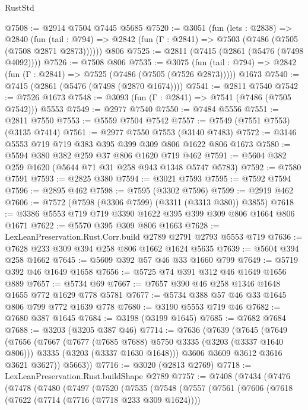 \begin{lexlean}{RustStd}
\begin{coremodule}
@7508 := @2914 @7504 @7445 @5685
@7520 := @3051
    (fun (lets : @2838) =>
    @2840
      (fun (tail : @794) => @2842 (fun (Γ : @2841) => @7503 (@7486 (@7505 (@7508 @2871 @2873))))))
    @806
@7525 := @2811 (@7415 (@2861 (@5476 (@7498 @4092))))
@7526 := @7508 @806
@7535 := @3075
    (fun (tail : @794) => @2842 (fun (Γ : @2841) => @7525 (@7486 (@7505 (@7526 @2873)))))
    @1673
@7540 := @7415 (@2861 (@5476 (@7498 (@2870 @1674))))
@7541 := @2811 @7540
@7542 := @7526 @1673
@7548 := @3093 (fun (Γ : @2841) => @7541 (@7486 (@7505 @7542))) @5553
@7549 := @2977 @7540
@7550 := @7484 @5556
@7551 := @2811 @7550
@7553 := @5559 @7504 @7542
@7557 := @7549 (@7551 @7553) (@3135 @7414)
@7561 := @2977 @7550 @7553 (@3140 @7483)
@7572 := @3146 @5553 @719 @719 @383 @395 @399 @309 @806 @1622 @806 @1673
@7580 := @5594 @380 @382 @259 @37 @806 @1620 @719 @462
@7591 := @5604 @382 @259 @1620 (@5644 @71 @31 @258 @943 @1348 @5747 @5783)
@7592 := @7580 @7591
@7593 := @2825 @380
@7594 := @3021 @7593
@7595 := @7592 @7594
@7596 := @2895 @462
@7598 := @7595 (@3302 @7596)
@7599 := @2919 @462
@7606 := @7572 (@7598 (@3306 @7599) (@3311 (@3313 @380)) @3855)
@7618 := @3386 @5553 @719 @719 @3390 @1622 @395 @399 @309 @806 @1664 @806 @1671
@7622 := @5570 @395 @309 @806 @1663
@7628 := LexLeanPreservation.Rust.Corr.build @2789 @2791 @2793 @5553 @719
@7636 := @7628 @233 @309 @394 @258 @806 @1662 @1624 @5635
@7639 := @5604 @394 @258 @1662
@7645 := @5609 @392 @57 @46 @33 @1660 @799
@7649 := @5719 @392 @46 @1649 @1658
@7656 := @5725 @74 @391 @312 @46 @1649 @1656 @889
@7657 := @5734 @69
@7667 := @7657 @390 @46 @258 @1346 @1648 @1655 @772 @1629 @778 @5781
@7677 := @5734 @388 @57 @46 @33 @1645 @806 @799 @772 @1639 @778
@7680 := @3190 @5553 @719 @46
@7682 := @7680 @387 @1645
@7684 := @3198 (@3199 @1645)
@7685 := @7682 @7684
@7688 := @3203 (@3205 @387 @46)
@7714 := @7636
    (@7639
      (@7645
        (@7649
          (@7656
            (@7667
              (@7677 (@7685 @7688) @5750 @3335 (@3203 (@3337 @1640 @806)))
              @3335
              (@3203 (@3337 @1630 @1648)))
            @3606
            @3609
            @3612
            @3616
            @3621
            @3627))
        @5663))
@7716 := @3020 (@2813 @2769)
@7718 := LexLeanPreservation.Rust.buildShape @2789
@7757 := @7408
    (@7434
      (@7476
        (@7478
          (@7480
            (@7497
              (@7520
                (@7535
                  (@7548
                    (@7557
                      (@7561
                        (@7606
                          (@7618
                            (@7622 (@7714 (@7716 (@7718 @233 @309 @1624))))

\end{coremodule}
\end{lexlean}
